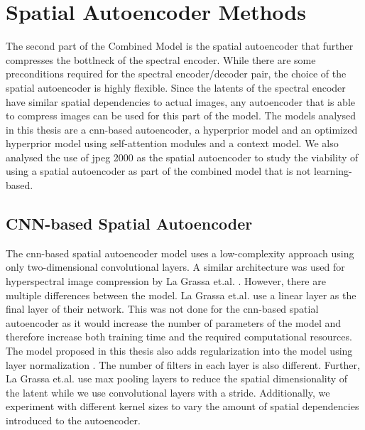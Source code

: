 \section{Spatial Autoencoder Methods\label{sec:spatialae}}
The second part of the Combined Model is the spatial autoencoder that further compresses the bottlneck of the spectral encoder. While there are some preconditions required for the spectral encoder/decoder pair, the choice of the spatial autoencoder is highly flexible. Since the latents of the spectral encoder have similar spatial dependencies to actual images, any autoencoder that is able to compress images can be used for this part of the model. The models analysed in this thesis are a \ac{cnn}-based autoencoder, a hyperprior model and an optimized hyperprior model using self-attention modules and a context model. We also analysed the use of \ac{jpeg} 2000 as the spatial autoencoder to study the viability of using a spatial autoencoder as part of the combined model that is not learning-based.
\subsection{CNN-based Spatial Autoencoder\label{sec:conv2d}}
The \ac{cnn}-based spatial autoencoder model uses a low-complexity approach using only two-dimensional convolutional layers. A similar architecture was used for hyperspectral image compression by La Grassa et.al. \citep{la_grassa_hyperspectral_2022}. However, there are multiple differences between the model. La Grassa et.al. use a linear layer as the final layer of their network. This was not done for the \ac{cnn}-based spatial autoencoder as it would increase the number of parameters of the model and therefore increase both training time and the required computational resources. The model proposed in this thesis also adds regularization into the model using layer normalization \citep{ba_layer_2016}. The number of filters in each layer is also different. Further, La Grassa et.al. use max pooling layers to reduce the spatial dimensionality of the latent while we use convolutional layers with a stride. Additionally, we experiment with different kernel sizes to vary the amount of spatial dependencies introduced to the autoencoder.

